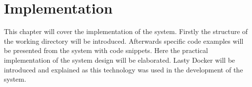 \chapter{Implementation}\label{ch:implementation}
This chapter will cover the implementation of the system.
Firstly the structure of the working directory will be introduced.
Afterwards specific code examples will be presented from the system with code snippets.
Here the practical implementation of the system design will be elaborated.
Lasty Docker will be introduced and explained as this technology was used in the development of the system.



